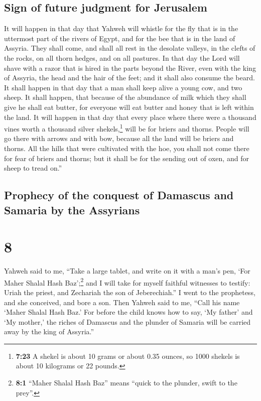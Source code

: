 \hypertarget{sign-of-future-judgment-for-jerusalem}{%
\subsection{Sign of future judgment for
Jerusalem}\label{sign-of-future-judgment-for-jerusalem}}

 It will happen in that day that Yahweh will whistle for
the fly that is in the uttermost part of the rivers of Egypt, and for
the bee that is in the land of Assyria.  They shall come,
and shall all rest in the desolate valleys, in the clefts of the rocks,
on all thorn hedges, and on all pastures.  In that day
the Lord will shave with a razor that is hired in the parts beyond the
River, even with the king of Assyria, the head and the hair of the feet;
and it shall also consume the beard.  It shall happen in
that day that a man shall keep alive a young cow, and two sheep.
 It shall happen, that because of the abundance of milk
which they shall give he shall eat butter, for everyone will eat butter
and honey that is left within the land.  It will happen
in that day that every place where there were a thousand vines worth a
thousand silver shekels,\footnote{\textbf{7:23} A shekel is about 10
  grams or about 0.35 ounces, so 1000 shekels is about 10 kilograms or
  22 pounds.} will be for briers and thorns.  People will
go there with arrows and with bow, because all the land will be briers
and thorns.  All the hills that were cultivated with the
hoe, you shall not come there for fear of briers and thorns; but it
shall be for the sending out of oxen, and for sheep to tread on.''

\hypertarget{prophecy-of-the-conquest-of-damascus-and-samaria-by-the-assyrians}{%
\subsection{Prophecy of the conquest of Damascus and Samaria by the
Assyrians}\label{prophecy-of-the-conquest-of-damascus-and-samaria-by-the-assyrians}}

\hypertarget{section-7}{%
\section{8}\label{section-7}}

 Yahweh said to me, ``Take a large tablet, and write on it
with a man's pen, `For Maher Shalal Hash Baz';\footnote{\textbf{8:1}
  ``Maher Shalal Hash Baz'' means ``quick to the plunder, swift to the
  prey''.}  and I will take for myself faithful witnesses
to testify: Uriah the priest, and Zechariah the son of Jeberechiah.''
 I went to the prophetess, and she conceived, and bore a
son. Then Yahweh said to me, ``Call his name `Maher Shalal Hash Baz.'
 For before the child knows how to say, `My father' and
`My mother,' the riches of Damascus and the plunder of Samaria will be
carried away by the king of Assyria.''

